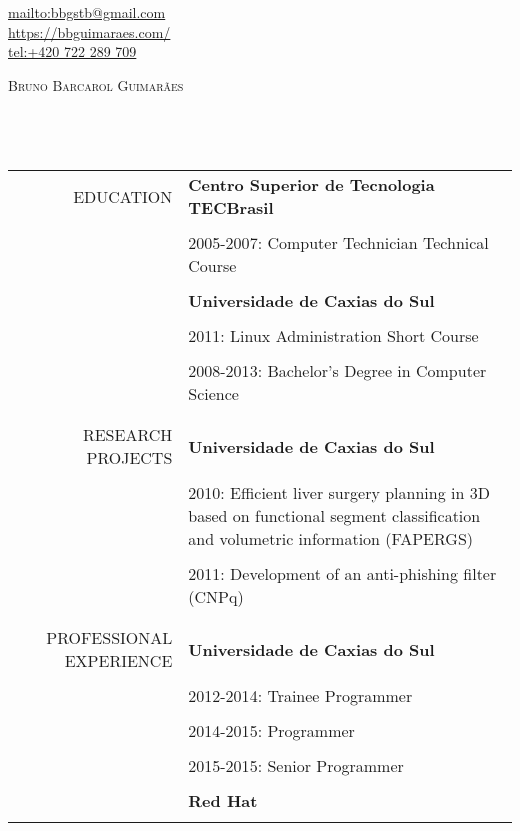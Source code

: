 \begin{flushright}
    \url{mailto:bbgstb@gmail.com} \\
    \url{https://bbguimaraes.com/} \\
    \url{tel:+420 722 289 709} \\
\end{flushright}
\vspace{5mm}
\textsc{\Huge Bruno Barcarol Guimarães} \\\\\\\\
\begin{tabular}{rp{12cm}}
    \uppercase{Education}
    & \textbf{Centro Superior de Tecnologia TECBrasil} \\\\
    & 2005-2007: Computer Technician Technical Course \\\\
    & \textbf{Universidade de Caxias do Sul} \\\\
    & 2011: Linux Administration Short Course \\\\
    & 2008-2013: Bachelor's Degree in Computer Science
    \\\\
    \hline
    \\
    \uppercase{Research projects}
    & \textbf{Universidade de Caxias do Sul} \\\\
    & 2010:
        Efficient liver surgery planning in 3D based on functional segment
        classification and volumetric information (FAPERGS) \\\\
    & 2011: Development of an anti-phishing filter (CNPq)
    \\\\
    \hline
    \\
    \uppercase{Professional experience}
    & \textbf{Universidade de Caxias do Sul} \\\\
    & 2012-2014: Trainee Programmer \\\\
    & 2014-2015: Programmer \\\\
    & 2015-2015: Senior Programmer \\\\
    & \textbf{Red Hat} \\\\

\end{tabular}
